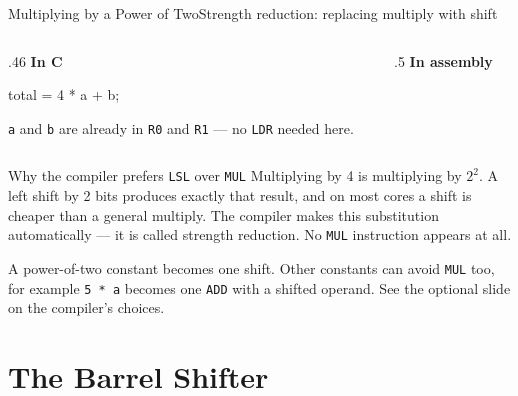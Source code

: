 \documentclass[9pt,aspectratio=169,xcolor=table]{beamer}
\begin{document}
\begin{frame}[fragile]{Multiplying by a Power of Two}{Strength reduction: replacing multiply with shift}
    \begin{columns}[T]
    \begin{column}{.46\textwidth}
        \textbf{In C}

        \vspace{1mm}
        \begin{cc}
total = 4 * a + b;
        \end{cc}

        \vspace{2mm}
        {\small \texttt{a} and \texttt{b} are already in \texttt{R0} and
        \texttt{R1} --- no \texttt{LDR} needed here.}
    \end{column}
    \begin{column}{.5\textwidth}
        \textbf{In assembly}

        \vspace{1mm}
    \end{column}
    \end{columns}

    \vspace{3mm}
    \begin{block}{Why the compiler prefers \texttt{LSL} over \texttt{MUL}}
        Multiplying by \alert{4} is multiplying by $2^2$. A left shift
        by 2 bits produces exactly that result, and on most cores a
        shift is \alert{cheaper} than a general multiply. The compiler
        makes this substitution automatically --- it is called
        \alert{strength reduction}. No \texttt{MUL} instruction appears
        at all.
    \end{block}

    \vspace{1mm}
    {\small A power-of-two constant becomes one shift. Other constants can
    avoid \texttt{MUL} too, for example \texttt{5 * a} becomes one
    \texttt{ADD} with a shifted operand. See the optional slide on the
    compiler's choices.}
\end{frame}


\section{The Barrel Shifter}
\end{document}

